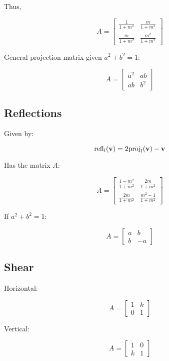 Thus,

\[A=
    \begin{bmatrix}\frac{1}{1+m^2}&\frac{m}{1+m^2}\\\frac{m}{1+m^2}&\frac{m^2}{1+m^2}\end{bmatrix}
\]

General projection matrix given $a^2+b^2=1$:

\[\boxed{
    A= \begin{bmatrix}a^2&ab\\ ab&b^2\end{bmatrix}
}\]

\subsection{Reflections}

Given by:

\[\mathrm{refl}_l(\textbf{v})=2\mathrm{proj}_l(\textbf{v})-\textbf{v}\]

Has the matrix $A$:

\[A= \begin{bmatrix}\frac{1-m^2}{1+m^2}&\frac{2m}{1+m^2}\\\frac{2m}{1+m^2}&\frac{m^2-1}{1+m^2}\end{bmatrix}\]

If $a^2+b^2=1$:

\[\boxed{
    A= \begin{bmatrix}a&b\\ b&-a\end{bmatrix}
}\]

\subsection{Shear}

Horizontal:

\[A= \begin{bmatrix}1&k\\ 0&1\end{bmatrix}\]

Vertical:

\[A= \begin{bmatrix}1&0\\ k&1\end{bmatrix}\]
